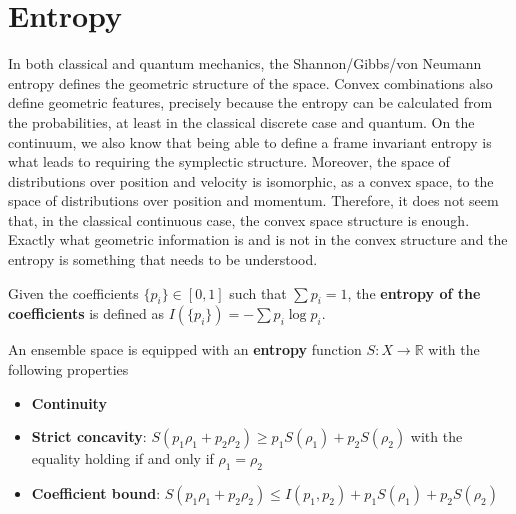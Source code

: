 \section{Entropy}

In both classical and quantum mechanics, the Shannon/Gibbs/von Neumann entropy defines the geometric structure of the space. Convex combinations also define geometric features, precisely because the entropy can be calculated from the probabilities, at least in the classical discrete case and quantum. On the continuum, we also know that being able to define a frame invariant entropy is what leads to requiring the symplectic structure. Moreover, the space of distributions over position and velocity is isomorphic, as a convex space, to the space of distributions over position and momentum. Therefore, it does not seem that, in the classical continuous case, the convex space structure is enough. Exactly what geometric information is and is not in the convex structure and the entropy is something that needs to be understood.

\begin{defn}
	Given the coefficients $\{p_i\} \in [0,1]$ such that $\sum p_i = 1$, the \textbf{entropy of the coefficients} is defined as $I(\{p_i\}) = - \sum p_i \log p_i $.
\end{defn}

\begin{ext}
	An ensemble space is equipped with an \textbf{entropy} function $S : X \to \mathbb{R}$ with the following properties
	\begin{itemize}
		\item \textbf{Continuity}
		\item \textbf{Strict concavity}: $S(p_1\rho_1 + p_2 \rho_2) \geq p_1 S(\rho_1) + p_2 S(\rho_2)$ with the equality holding if and only if $\rho_1 = \rho_2$
		\item \textbf{Coefficient bound}: $S(p_1\rho_1 + p_2 \rho_2) \leq I(p_1, p_2) + p_1 S(\rho_1) + p_2 S(\rho_2)$
	\end{itemize}
\end{ext}

